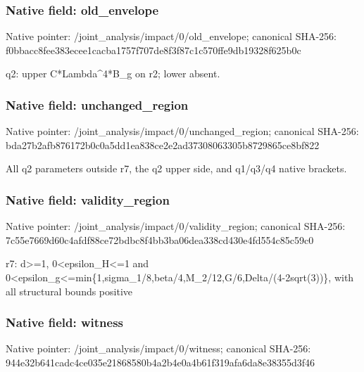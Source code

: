 \documentclass[10pt,a4paper]{article}
\begin{document}
\subsubsection{Native field: old\_\allowbreak{}envelope}
Native pointer: /joint\_\allowbreak{}analysis/impact/0/old\_\allowbreak{}envelope; canonical SHA-256: f0bbacc8fee383ecee1cacba1757f707de8f3f87c1c570ffe9db19328f625b0c

\begingroup\raggedright\sloppy q2:\allowbreak{} upper C*Lambda\textasciicircum{}4*B\_\allowbreak{}g on r2;\allowbreak{} lower absent.\par\endgroup

\subsubsection{Native field: unchanged\_\allowbreak{}region}
Native pointer: /joint\_\allowbreak{}analysis/impact/0/unchanged\_\allowbreak{}region; canonical SHA-256: bda27b2afb876172b0c0a5dd1ea838ce2e2ad37308063305b8729865ce8bf822

\begingroup\raggedright\sloppy All q2 parameters outside r7,\allowbreak{} the q2 upper side,\allowbreak{} and q1/\allowbreak{}q3/\allowbreak{}q4 native brackets.\par\endgroup

\subsubsection{Native field: validity\_\allowbreak{}region}
Native pointer: /joint\_\allowbreak{}analysis/impact/0/validity\_\allowbreak{}region; canonical SHA-256: 7c55e7669d60c4afdf88ce72bdbc8f4bb3ba06dea338cd430e4fd554c85c59c0

\begingroup\raggedright\sloppy r7:\allowbreak{} d>=\allowbreak{}1,\allowbreak{} 0<epsilon\_\allowbreak{}H<=\allowbreak{}1 and 0<epsilon\_\allowbreak{}g<=\allowbreak{}min\{1,\allowbreak{}sigma\_\allowbreak{}1/\allowbreak{}8,\allowbreak{}beta/\allowbreak{}4,\allowbreak{}M\_\allowbreak{}2/\allowbreak{}12,\allowbreak{}G/\allowbreak{}6,\allowbreak{}Delta/\allowbreak{}(4-2sqrt(3))\},\allowbreak{} with all structural bounds positive\par\endgroup

\subsubsection{Native field: witness}
Native pointer: /joint\_\allowbreak{}analysis/impact/0/witness; canonical SHA-256: 944e32b641cadc4ce035e21868580b4a2b4e0a4b61f319afa6da8e38355d3f46
\end{document}
